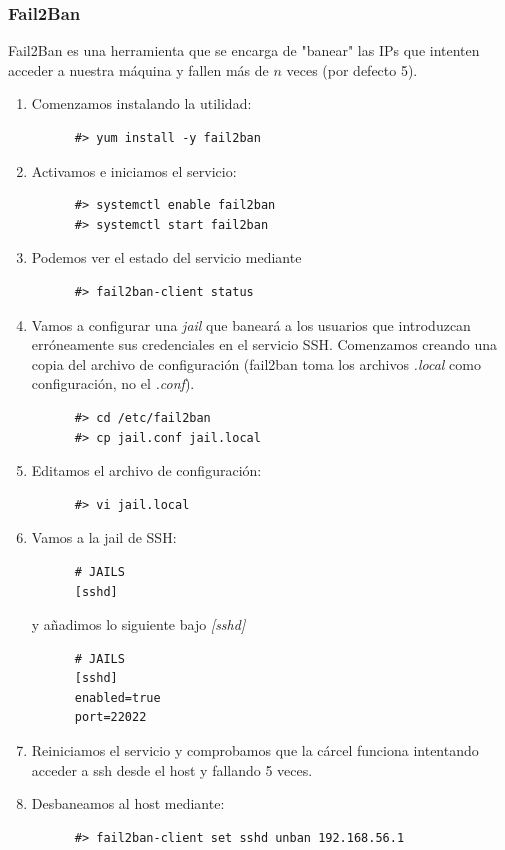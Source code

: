 \documentclass[12pt,spanish]{article}
\begin{document}
  \subsubsection{Fail2Ban}

  Fail2Ban es una herramienta que se encarga de "banear" las IPs que intenten acceder a nuestra máquina y fallen más de $n$ veces (por defecto 5).

  \begin{enumerate}
    \item Comenzamos instalando la utilidad:
    \begin{lstlisting}
      #> yum install -y fail2ban
    \end{lstlisting}
    \item Activamos e iniciamos el servicio:
    \begin{lstlisting}
      #> systemctl enable fail2ban
      #> systemctl start fail2ban
    \end{lstlisting}
    \item Podemos ver el estado del servicio mediante
    \begin{lstlisting}
      #> fail2ban-client status
    \end{lstlisting}
    \item Vamos a configurar una \textit{jail} que baneará a los usuarios que introduzcan erróneamente sus credenciales en el servicio SSH. Comenzamos creando una copia del archivo de configuración (fail2ban toma los archivos \textit{.local} como configuración, no el \textit{.conf}).
    \begin{lstlisting}
      #> cd /etc/fail2ban
      #> cp jail.conf jail.local
    \end{lstlisting}
    \item Editamos el archivo de configuración:
    \begin{lstlisting}
      #> vi jail.local
    \end{lstlisting}
    \item Vamos a la jail de SSH:
    \begin{lstlisting}
      # JAILS
      [sshd]
    \end{lstlisting}
    y añadimos lo siguiente bajo \textit{[sshd]}
    \begin{lstlisting}
      # JAILS
      [sshd]
      enabled=true
      port=22022
    \end{lstlisting}
    \item Reiniciamos el servicio y comprobamos que la cárcel funciona intentando acceder a ssh desde el host y fallando 5 veces.
    \item Desbaneamos al host mediante:
    \begin{lstlisting}
      #> fail2ban-client set sshd unban 192.168.56.1
    \end{lstlisting}
  \end{enumerate}
\end{document}
